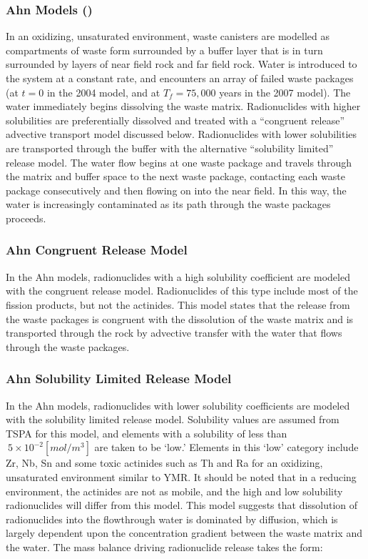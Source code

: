 \subsubsection{Ahn Models (\cite{ahn_environmental_2004,
ahn_environmental_2007})}

In an oxidizing, unsaturated environment, waste canisters are modelled as 
compartments of waste form surrounded by a buffer layer that is in turn 
surrounded by layers of near field rock and far field rock. Water is introduced 
to the system at a constant rate, and encounters an array of failed waste 
packages (at $t=0$ in the 2004 model, and at $T_f=75,000$ years in the 2007 model). 
The water immediately begins dissolving the waste matrix.  Radionuclides with higher 
solubilities are preferentially dissolved and treated with a ``congruent 
release'' advective transport model discussed
below. Radionuclides with lower solubilities are transported through the buffer with
the alternative ``solubility limited'' release model. The water flow begins at
one waste package and travels through the matrix and buffer space to the next
waste package, contacting each waste package consecutively and then flowing on
into the near field. In this way, the water is increasingly contaminated as its
path through the waste packages proceeds.  

\subsubsection{Ahn Congruent Release Model} 

In the Ahn models, radionuclides with a high solubility coefficient are modeled with
the congruent release model.  Radionuclides of this type include most of the fission
products, but not the actinides. This model states that the release from the
waste packages is congruent with the dissolution of the waste matrix and is
transported through the rock by advective transfer with the water that flows
through the waste packages.  

\subsubsection{Ahn Solubility Limited Release Model}

In the Ahn models, radionuclides with lower solubility coefficients are modeled with
the solubility limited release model.  Solubility values are assumed from TSPA
for this model, and elements with a solubility of less than $~5\times 10^{-2}
[mol/m^3]$ are taken to be
`low.' Elements in this `low' category include Zr, Nb, Sn and some toxic actinides 
such as Th and Ra for an oxidizing, unsaturated environment similar to \gls{YMR}.
It should be noted that in a reducing environment, the actinides are not as mobile, 
and the high and low solubility radionuclides will differ from this model.
This model suggests that dissolution of radionuclides into the flowthrough water 
is dominated by diffusion, which is largely dependent upon the concentration 
gradient between the waste matrix and the water. The mass balance driving 
radionuclide release takes the form:

